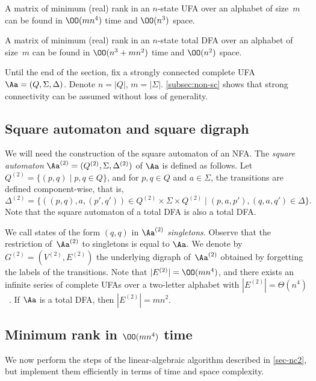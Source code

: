 \begin{thm}\label{thm:finding-matrix}
 A matrix of minimum (real) rank in an $n$-state UFA over an alphabet of size~$m$ can be found in  $\OO(mn^4)$ time and $\OO(n^3)$ space. 
\end{thm}

\begin{thm}\label{thm:main-dfas}
    A matrix of minimum (real) rank in an $n$-state total DFA over an alphabet of size~$m$ can be found in $\OO(n^3 + mn^2)$ time and $\OO(n^2)$ space.
\end{thm}

\noindent
Until the end of the section, fix a strongly connected complete UFA $\Aa = (Q, \Sigma, \Delta)$. Denote $n = |Q|$, $m = |\Sigma|$. \autoref{subsec:non-sc} shows that strong connectivity can be assumed without loss of generality.

\subsection{Square automaton and square digraph}\label{subsec:square-aut}

We will need the construction of the square automaton of an NFA. The \emph{square automaton} 
$\Aa^{(2)} = (Q^{(2)}, \Sigma, \Delta^{(2)})$ of $\Aa$ is defined as follows. Let $Q^{(2)} = \{(p, q) \mid p, q \in Q\}$, and for $p, q \in Q$ and $a \in \Sigma$, the transitions are defined component-wise, that is, 
\[\Delta^{(2)} = \{ ((p, q), a, (p', q')) \in Q^{(2)} \times \Sigma \times Q^{(2)} \mid (p, a, p'), (q,a,q') \in \Delta\}.\]
Note that the square automaton of a total DFA is also a total DFA. 


We call states of the form $(q, q)$ in $\Aa^{(2)}$ \emph{singletons}. Observe that the restriction of~$\Aa^{(2)}$ to singletons is equal to $\Aa$.
We denote by $G^{(2)} = (V^{(2)}, E^{(2)})$ the underlying digraph of~$\Aa^{(2)}$ obtained by forgetting the labels of the transitions. Note that $|E^{(2)}| = \OO(mn^4)$, and there exists an infinite series of complete UFAs over a two-letter alphabet with $|E^{(2)}| = \Theta(n^4)$~\cite[Appendix A]{Kiefer2019Arxiv}. If $\Aa$ is a total DFA, then $|E^{(2)}| = mn^2$.


\subsection{Minimum rank in \texorpdfstring{$\OO(mn^4)$}{O(n4)} time}\label{subsec:linalg-time}

We now perform the steps of the linear-algebraic algorithm described in \autoref{sec-nc2}, but implement them efficiently in terms of time and space complexity.

